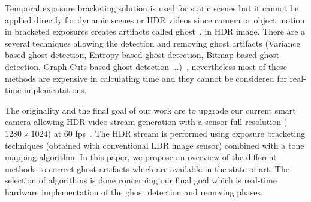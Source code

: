 \documentclass[10pt,twocolumn,letterpaper]{article}
\begin{document}
Temporal exposure bracketing solution is used for static scenes but it cannot be applied directly for dynamic scenes or HDR videos since camera or object motion in bracketed exposures creates artifacts called ghost~\cite{Sen2012}, in HDR image. There are a several techniques allowing the detection and removing ghost artifacts (Variance based ghost detection, Entropy based ghost detection, Bitmap based ghost detection, Graph-Cuts based ghost detection ...)~\cite{Srikantha2012}, nevertheless most of these methods are expensive in calculating time and they cannot be considered for real-time implementations.

The originality and the final goal of our work are to upgrade our current smart camera allowing HDR video stream generation with a sensor full-resolution ($1280 \times 1024$) at 60 fps~\cite{lapray2014}. The HDR stream is performed using exposure bracketing techniques (obtained with conventional LDR image sensor) combined with a tone mapping algorithm. In this paper, we propose an overview of the different methods to correct ghost artifacts which are available in the state of art. The
selection of algorithms is done concerning our final goal which is real-time hardware implementation of the ghost detection and removing phases.

{\small
\printbibliography
}
\end{document}
